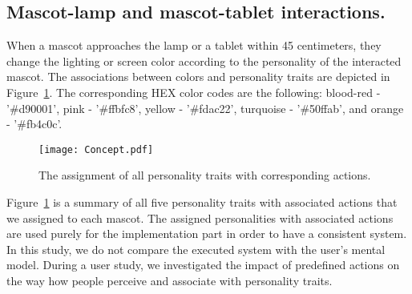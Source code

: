 \subsection*{Mascot-lamp and mascot-tablet interactions.}
When a mascot approaches the lamp or a tablet within 45 centimeters, they change the lighting or screen color according to the
personality of the interacted mascot.
The associations between colors and personality traits are depicted in Figure~\ref{fig:Concept}.
The corresponding HEX color codes are the following:
blood-red - '\#d90001', pink - '\#ffbfc8',
yellow - '\#fdac22', turquoise - '\#50ffab', and orange - '\#fb4c0c'.

\begin{figure}[hbt!]
    \centering
    \texttt{[image: Concept.pdf]}
    \caption{The assignment of all personality traits with corresponding actions.}
    \label{fig:Concept}
\end{figure}

Figure~\ref{fig:Concept} is a summary of
all five personality traits with associated actions that we assigned to each mascot.
The assigned personalities with associated actions are used purely for the implementation part in order
to have a consistent system.
In this study, we do not compare the executed system with the user's mental model.
During a user study, we investigated the impact of predefined actions on the way how people
perceive and associate with personality traits.
